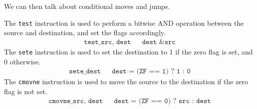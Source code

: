 \documentclass{article}
\begin{document}
      We can then talk about conditional moves and jumps.  

      \begin{definition}
        The \texttt{test} instruction is used to perform a bitwise AND operation between the source and destination, and set the flags accordingly. 
        \begin{align*}
          \texttt{test\_ src, dest} && \texttt{dest \& src} 
        \end{align*}
        The \texttt{sete} instruction is used to set the destination to 1 if the zero flag is set, and 0 otherwise. 
        \begin{align*}
          \texttt{sete\_ dest} && \texttt{dest = (ZF == 1) ? 1 : 0} 
        \end{align*}
        The \texttt{cmovne} instruction is used to move the source to the destination if the zero flag is not set. 
        \begin{align*}
          \texttt{cmovne\_ src, dest} && \texttt{dest = (ZF == 0) ? src : dest} 
        \end{align*}
      \end{definition}
\end{document}
